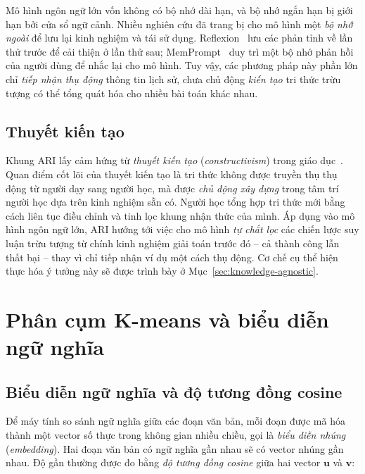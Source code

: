 Mô hình ngôn ngữ lớn vốn không có bộ nhớ dài hạn, và bộ nhớ ngắn hạn bị giới hạn bởi cửa sổ ngữ
cảnh. Nhiều nghiên cứu đã trang bị cho mô hình một \textit{bộ nhớ ngoài} để lưu lại kinh nghiệm và
tái sử dụng. Reflexion~\cite{shinn2023reflexion} lưu các phản tỉnh về lần thử trước để cải thiện ở
lần thử sau; MemPrompt~\cite{madaan2022memprompt} duy trì một bộ nhớ phản hồi của người dùng để
nhắc lại cho mô hình. Tuy vậy, các phương pháp này phần lớn chỉ \emph{tiếp nhận thụ động} thông
tin lịch sử, chưa chủ động \emph{kiến tạo} tri thức trừu tượng có thể tổng quát hóa cho nhiều bài
toán khác nhau.

\subsection{Thuyết kiến tạo}

Khung ARI lấy cảm hứng từ \textit{thuyết kiến tạo} (\textit{constructivism}) trong giáo
dục~\cite{savery1995constructivism, kirschner2006minimal}. Quan điểm cốt lõi của thuyết kiến tạo
là tri thức không được truyền thụ thụ động từ người dạy sang người học, mà được \emph{chủ động xây
dựng} trong tâm trí người học dựa trên kinh nghiệm sẵn có. Người học tổng hợp tri thức mới bằng
cách liên tục điều chỉnh và tinh lọc khung nhận thức của mình. Áp dụng vào mô hình ngôn ngữ lớn,
ARI hướng tới việc cho mô hình \emph{tự chắt lọc} các chiến lược suy luận trừu tượng từ chính kinh
nghiệm giải toán trước đó -- cả thành công lẫn thất bại -- thay vì chỉ tiếp nhận ví dụ một cách thụ
động. Cơ chế cụ thể hiện thực hóa ý tưởng này sẽ được trình bày ở Mục~\ref{sec:knowledge-agnostic}.

\section{Phân cụm K-means và biểu diễn ngữ nghĩa}
\label{sec:kmeans}

\subsection{Biểu diễn ngữ nghĩa và độ tương đồng cosine}

Để máy tính so sánh ngữ nghĩa giữa các đoạn văn bản, mỗi đoạn được mã hóa thành một vector số thực
trong không gian nhiều chiều, gọi là \textit{biểu diễn nhúng} (\textit{embedding}). Hai đoạn văn
bản có ngữ nghĩa gần nhau sẽ có vector nhúng gần nhau. Độ gần thường được đo bằng \textit{độ tương
đồng cosine} giữa hai vector $\mathbf{u}$ và $\mathbf{v}$:

